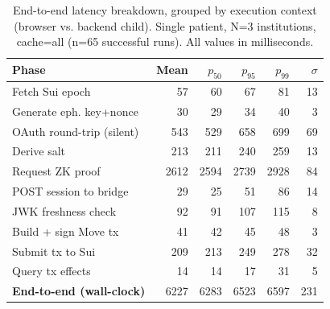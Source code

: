 \begin{table}[t]
  \centering
  \caption{End-to-end latency breakdown, grouped by execution context
    (browser vs. backend child). Single patient, N=3 institutions, cache=all
    (n=65 successful runs). All values in milliseconds.}
  \label{tab:latency_breakdown}
  \footnotesize
  \begin{tabular}{lrrrrr}
    \toprule
    \textbf{Phase} & \textbf{Mean} & \textbf{$p_{50}$} & \textbf{$p_{95}$} & \textbf{$p_{99}$} & \textbf{$\sigma$} \\
    \midrule
  Fetch Sui epoch & 57 & 60 & 67 & 81 & 13 \\
  Generate eph. key+nonce & 30 & 29 & 34 & 40 & 3 \\
  OAuth round-trip (silent) & 543 & 529 & 658 & 699 & 69 \\
  Derive salt & 213 & 211 & 240 & 259 & 13 \\
  Request ZK proof & 2612 & 2594 & 2739 & 2928 & 84 \\
  POST session to bridge & 29 & 25 & 51 & 86 & 14 \\
\addlinespace
  JWK freshness check & 92 & 91 & 107 & 115 & 8 \\
  Build + sign Move tx & 41 & 42 & 45 & 48 & 3 \\
  Submit tx to Sui & 209 & 213 & 249 & 278 & 32 \\
  Query tx effects & 14 & 14 & 17 & 31 & 5 \\
\addlinespace
  \textbf{End-to-end (wall-clock)} & 6227 & 6283 & 6523 & 6597 & 231 \\
    \bottomrule
  \end{tabular}
\end{table}
